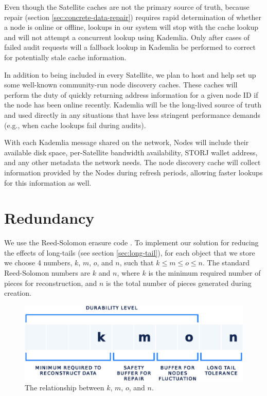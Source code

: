 \documentclass[8pt,fleqn,openany]{book}
\begin{document}
Even though the Satellite caches are not the primary source of truth, because repair
(section \ref{sec:concrete-data-repair}) requires rapid determination of
whether a node is online or offline, lookups in our system will stop with the
cache lookup and will not attempt a concurrent lookup using Kademlia.
Only after cases of failed audit requests will a fallback lookup in Kademlia
be performed to correct for potentially stale cache information.

In addition to being included in every Satellite,
we plan to host and help set up some well-known community-run node discovery caches.
These caches will perform the duty of quickly returning address information
for a given node ID if the node has been online recently. Kademlia will be the
long-lived source of truth and used directly in any situations that
have less stringent performance demands (e.g., when cache lookups fail during
audits).

With each Kademlia message shared on the network, Nodes will include their
available disk space, per-Satellite bandwidth availability,
STORJ wallet address, and any other metadata the network needs.
The node discovery cache will collect information provided by the Nodes
during refresh periods, allowing faster lookups for this information as well.

\section{Redundancy}\label{sec:concrete-redundancy}

We use the Reed-Solomon erasure code \cite{rs}.
To implement our solution for reducing the effects of long-tails (see section
\ref{sec:long-tail}), for each object that we store
we choose 4 numbers, $k$, $m$, $o$, and $n$, such that $k\le m\le o\le n$.
The standard Reed-Solomon numbers are $k$ and $n$, where $k$ is the minimum
required number of pieces for reconstruction, and $n$ is the total number of
pieces generated during creation.

\begin{figure}[!htbp]
\centering
\includegraphics[width=.8\textwidth]{images/kmon.eps}
\caption{The relationship between $k$, $m$, $o$, and $n$.}
\end{figure}
\end{document}
